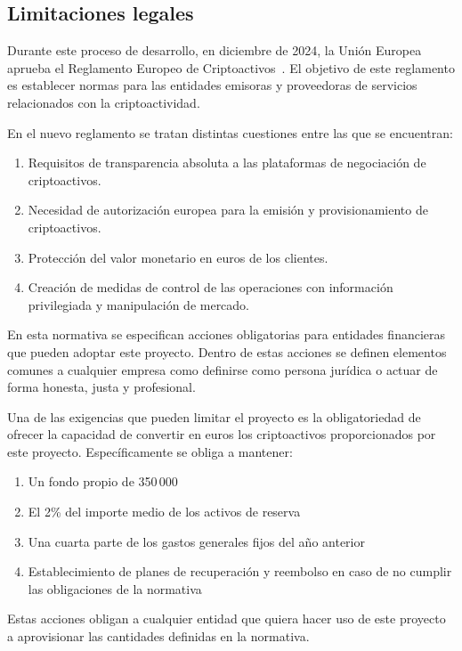 \subsection{Limitaciones legales}
\label{subsec:limitaciones-legales}

Durante este proceso de desarrollo, en diciembre de 2024, la Unión Europea aprueba 
el Reglamento Europeo de Criptoactivos~\cite{[24]}. 
El objetivo de este reglamento es establecer normas para las entidades emisoras
y proveedoras de servicios relacionados con la criptoactividad.

En el nuevo reglamento se  tratan distintas cuestiones entre las que se 
encuentran:
\begin{enumerate}
    \item Requisitos de transparencia absoluta a las plataformas de negociación 
    de criptoactivos.
    \item Necesidad de autorización europea para la emisión y provisionamiento
    de criptoactivos.
    \item Protección del valor monetario en euros de los clientes.
    \item Creación de medidas de control de las operaciones con información 
    privilegiada y manipulación de mercado.
\end{enumerate}

En esta normativa se especifican acciones obligatorias para entidades financieras 
que pueden adoptar este proyecto. Dentro de estas acciones se definen elementos 
comunes a cualquier empresa como definirse como persona jurídica o actuar de forma 
honesta, justa y profesional.

Una de las exigencias que pueden limitar el proyecto es la obligatoriedad de ofrecer
la capacidad de convertir en euros los criptoactivos proporcionados por este
proyecto. Específicamente se obliga a mantener:
\begin{enumerate}
    \item Un fondo propio de 350\,000~\texteuro{}
    \item El 2\% del importe medio de los activos de reserva
    \item Una cuarta parte de los gastos generales fijos del año anterior
    \item Establecimiento de planes de recuperación y reembolso en caso de no 
    cumplir las obligaciones de la normativa 
\end{enumerate}

Estas acciones obligan a cualquier entidad que quiera hacer uso de este proyecto 
a aprovisionar las cantidades definidas en la normativa.

